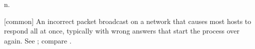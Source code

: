  n.

[common] An incorrect packet broadcast on a network that causes most hosts to
respond all at once, typically with wrong answers that start the process over
again. See ; compare .


